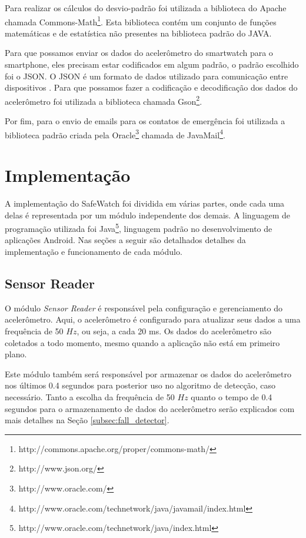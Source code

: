 Para realizar os cálculos do desvio-padrão foi utilizada a biblioteca do Apache chamada Commons-Math\footnote{http://commons.apache.org/proper/commons-math/}. Esta biblioteca contém um conjunto de funções matemáticas e de estatística não presentes na biblioteca padrão do JAVA. 

Para que possamos enviar os dados do acelerômetro do smartwatch para o smartphone, eles precisam estar codificados em algum padrão, o padrão escolhido foi o JSON. O JSON é um formato de dados utilizado para comunicação entre dispositivos \citep{JSON16}. Para que possamos fazer a codificação e decodificação dos dados do acelerômetro foi utilizada a biblioteca chamada Gson\footnote{http://www.json.org/}.

Por fim, para o envio de emails para os contatos de emergência foi utilizada a biblioteca padrão criada pela Oracle\footnote{http://www.oracle.com/} chamada de JavaMail\footnote{http://www.oracle.com/technetwork/java/javamail/index.html}. 





\section{Implementação}
\label{sec:implementation}
A implementação do SafeWatch foi dividida em várias partes, onde cada uma delas é representada por um módulo independente dos demais. A linguagem de programação utilizada foi Java\footnote{http://www.oracle.com/technetwork/java/index.html}, linguagem padrão no desenvolvimento de aplicações Android. Nas seções a seguir são detalhados detalhes da implementação e funcionamento de cada módulo.


\subsection{Sensor Reader}
O módulo \textit{Sensor Reader} é responsável pela configuração e gerenciamento do acelerômetro. Aqui, o acelerômetro é configurado para atualizar seus dados a uma frequência de 50 $Hz$, ou seja, a cada 20 ms. Os dados do acelerômetro são coletados a todo momento, mesmo quando a aplicação não está em primeiro plano.

Este módulo também será responsável por armazenar os dados do acelerômetro nos últimos 0.4 segundos para posterior uso no algoritmo de detecção, caso necessário. Tanto a escolha da frequência de 50 $Hz$ quanto o tempo de 0.4 segundos para o armazenamento de dados do acelerômetro serão explicados com mais detalhes na Seção \ref{subsec:fall_detector}. 



